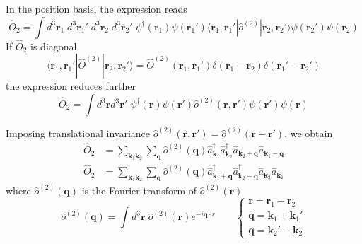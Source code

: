 \documentclass[../../../main.tex]{subfiles}
\begin{document}
In the position basis, the expression reads
\begin{equation*}
  \hat{O}_2 = \int d^3 \mathbf{r}_1 \; d^3 \mathbf{r}_1' \; d^3 \mathbf{r}_2 \; d^3 \mathbf{r}_2' \; \psi^\dagger(\mathbf{r}_1) \psi(\mathbf{r}_1') \langle \mathbf{r}_1, \mathbf{r}_1' | \hat{o}^{(2)} | \mathbf{r}_2, \mathbf{r}_2' \rangle \psi(\mathbf{r}_2') \psi(\mathbf{r}_2)
\end{equation*}
If $\hat{O }_2$ is diagonal
\begin{equation*}
  \langle \mathbf{r}_1, \mathbf{r}_1' | \hat{O}^{(2)} | \mathbf{r}_2, \mathbf{r}_2' \rangle = \hat{O}^{(2)}(\mathbf{r}_1, \mathbf{r}_1') \delta(\mathbf{r}_1 - \mathbf{r}_2) \delta(\mathbf{r}_1' - \mathbf{r}_2')
\end{equation*}
the expression reduces further
\begin{equation*}
  \hat{O}_2 = \int d^3 \mathbf{r} d^3 \mathbf{r}' \; \psi^\dagger(\mathbf{r}) \psi(\mathbf{r}') \hat{o}^{(2)}(\mathbf{r}, \mathbf{r}') \psi(\mathbf{r}') \psi(\mathbf{r})
\end{equation*}

Imposing translational invariance $\hat{o}^{(2)}(\mathbf{r}, \mathbf{r}') = \hat{o}^{(2)}(\mathbf{r} - \mathbf{r}')$, we obtain
\begin{align*}
  \hat{O}_2
   & =  \sum_{\mathbf{k}_1 \mathbf{k}_2 } \sum_{\mathbf{q}} \hat{o}^{(2)}(\mathbf{q}) \hat{a}_{\mathbf{k}_1}^\dagger \hat{a}_{\mathbf{k}_2}^\dagger \hat{a}_{\mathbf{k}_2+\mathbf{q}} \hat{a}_{\mathbf{k}_1-\mathbf{q}} \\
  \hat{O}_2
   & = \sum_{\mathbf{k}_1 \mathbf{k}_2 } \sum_{\mathbf{q}} \hat{o}^{(2)}(\mathbf{q}) \hat{a}_{\mathbf{k}_1+\mathbf{q}}^\dagger \hat{a}_{\mathbf{k}_2-\mathbf{q}}^\dagger \hat{a}_{\mathbf{k}_2} \hat{a}_{\mathbf{k}_1}
\end{align*}
where \( \hat{o}^{(2)}(\mathbf{q}) \) is the Fourier transform of \( \hat{o}^{(2)}(\mathbf{r}) \)
\begin{equation*}
  \hat{o}^{(2)}(\mathbf{q}) = \int d^3 \mathbf{r}\; \hat{o}^{(2)}(\mathbf{r}) e^{-i\mathbf{q} \cdot r}
  \qquad
  \begin{cases}
    \mathbf{r} = \mathbf{r}_1-\mathbf{r}_2    \\
    \mathbf{q} = \mathbf{k}_1 + \mathbf{k}_1' \\
    \mathbf{q}= \mathbf{k}_2' - \mathbf{k}_2
  \end{cases}
\end{equation*}
\end{document}

